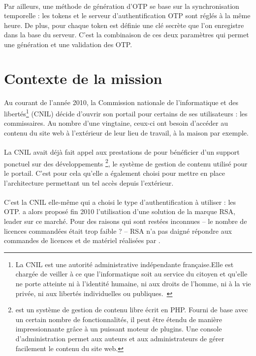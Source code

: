 \paragraph{}
Par ailleurs, une méthode de génération d'OTP se base sur la synchronisation temporelle : les tokens et le serveur d'authentification OTP sont réglés à la même heure.
De plus, pour chaque token est définie une clé secrète que l'on enregistre dans la base du serveur.
C'est la combinaison de ces deux paramètres qui permet une génération et une validation des OTP.


\section{Contexte de la mission}

\paragraph{}
Au courant de l'année 2010, la Commission nationale de l'informatique et des libertés\footnote{La CNIL est une autorité administrative indépendante française.Elle est chargée de veiller à ce que l'informatique soit au service du citoyen et qu'elle ne porte atteinte ni à l'identité humaine, ni aux droits de l'homme, ni à la vie privée, ni aux libertés individuelles ou publiques.~\cite{cnil}} (CNIL) décide d'ouvrir son portail \aintranet{} pour certains de ses utilisateurs : les commissaires.
Au nombre d'une vingtaine, ceux-ci ont besoin d'accéder au contenu du site web à l'extérieur de leur lieu de travail, à la maison par exemple.

\paragraph{}
La CNIL avait déjà fait appel aux prestations de \asmile{} pour bénéficier d'un support ponctuel sur des développements \atypo{}\footnote{\atypo{} est un système de gestion de contenu libre écrit en PHP. Fourni de base avec un certain nombre de fonctionnalités, il peut être étendu de manière impressionnante grâce à un puissant moteur de plugins. Une console d'administration permet aux auteurs et aux administrateurs de gérer facilement le contenu du site web.}, le système de gestion de contenu utilisé pour le portail.
C'est pour cela qu'elle a également choisi \asmile{} pour mettre en place l'architecture permettant un tel accès depuis l'extérieur.

\paragraph{}
C'est la CNIL elle-même qui a choisi le type d'authentification à utiliser : les OTP.
\asmile{} a alors proposé fin 2010 l'utilisation d'une solution de la marque RSA, leader sur ce marché.
Pour des raisons qui sont restées inconnues -- le nombre de licences commandées était trop faible ? -- RSA n'a pas daigné répondre aux commandes de licences et de matériel réalisées par \asmile.

